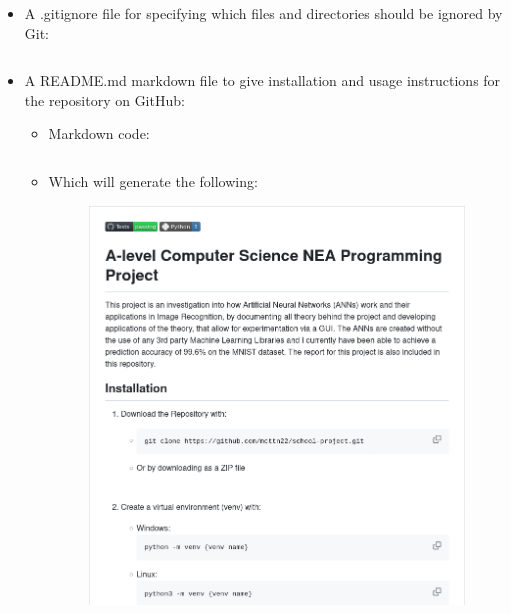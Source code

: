 \documentclass[./project-report/src/latex/project-report.tex]{subfiles}
\begin{document}
\begin{itemize}
    \item A .gitignore file for specifying which files and directories should be ignored by Git:
        \inputminted{text}{./.gitignore}
    \item A README.md markdown file to give installation and usage instructions for the repository on GitHub:
        \begin{itemize}
            \item Markdown code:
                \inputminted{markdown}{./README.md}
            \item Which will generate the following:
                \pagebreak
                \begin{figure}[h!]
                \centering
                \includegraphics[width=1\textwidth]{./project-report/src/images/readme-top.png}
                \end{figure}
                \pagebreak
                \begin{figure}[h!]
                \centering

\end{figure}
\end{itemize}
\end{itemize}
\end{document}
